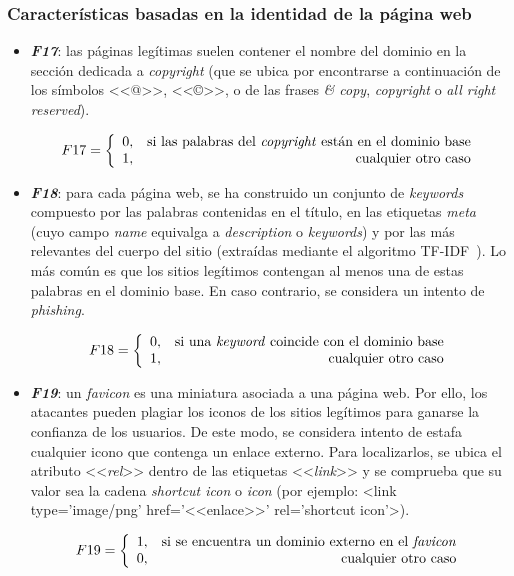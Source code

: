 \subsubsection{Características basadas en la identidad de la página web}

\begin{itemize}
	\item \textit{\textbf{F17}}: las páginas legítimas suelen contener el nombre del dominio en la sección dedicada a \textit{copyright} (que se ubica por encontrarse a continuación de los símbolos <<@>>, <<©>>, o de las frases \textit{\& copy}, \textit{copyright} o \textit{all right reserved}).

	\[F17 = \left\{ \begin{array}{lr} 0, & \text{si las palabras del \textit{copyright} están en el dominio base}\\
	1, & \text{\raggedright cualquier otro caso} \label{eqn:phishing_f17} \end{array}\right.\]
	
	\item \textit{\textbf{F18}}: para cada página web, se ha construido un conjunto de \textit{keywords} compuesto por las palabras contenidas en el título, en las etiquetas \textit{meta} (cuyo campo \textit{name} equivalga a \textit{description} o \textit{keywords}) y por las más relevantes del cuerpo del sitio (extraídas mediante el algoritmo TF-IDF~\cite{cantinatfidf}). Lo más común es que los sitios legítimos contengan al menos una de estas palabras en el dominio base. En caso contrario, se considera un intento de \textit{phishing}.
	
	\[F18 = \left\{ \begin{array}{lr} 0, & \text{si una \textit{keyword} coincide con el dominio base}\\
	1, & \text{\raggedright cualquier otro caso} \label{eqn:phishing_f18} \end{array}\right.\]
	
	\item \textit{\textbf{F19}}: un \textit{favicon} es una miniatura asociada a una página web. Por ello, los atacantes pueden plagiar los iconos de los sitios legítimos para ganarse la confianza de los usuarios. De este modo, se considera intento de estafa cualquier icono que contenga un enlace externo. Para localizarlos, se ubica el atributo <<\textit{rel}>> dentro de las etiquetas <<\textit{link}>> y se comprueba que su valor sea la cadena \textit{shortcut icon} o \textit{icon}  (por ejemplo: <link type='image/png' href='<<enlace>>' rel='shortcut icon'>).
	
	\[F19 = \left\{ \begin{array}{lr} 1, & \text{si se encuentra un dominio externo en el \textit{favicon}}\\
	0, & \text{\raggedright cualquier otro caso} \label{eqn:phishing_f19} \end{array}\right.\]
\end{itemize}




